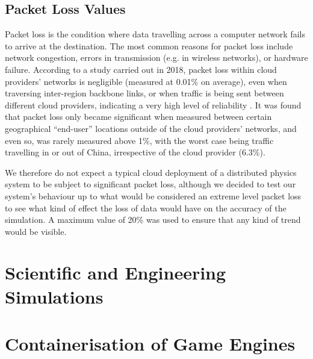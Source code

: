 \subsection{Packet Loss Values}

Packet loss is the condition where data travelling across a computer network fails to arrive at the destination. The most common reasons for packet loss include network congestion, errors in transmission (e.g. in wireless networks), or hardware failure. According to a study carried out in 2018, packet loss within cloud providers' networks is negligible (measured at 0.01\% on average), even when traversing inter-region backbone links, or when traffic is being sent between different cloud providers, indicating a very high level of reliability \cite{ThousandEyesCloudPerf2018}. It was found that packet loss only became significant when measured between certain geographical ``end-user'' locations outside of the cloud providers' networks, and even so, was rarely measured above 1\%, with the worst case being traffic travelling in or out of China, irrespective of the cloud provider (6.3\%).

We therefore do not expect a typical cloud deployment of a distributed physics system to be subject to significant packet loss, although we decided to test our system's behaviour up to what would be considered an extreme level packet loss to see what kind of effect the loss of data would have on the accuracy of the simulation. A maximum value of 20\% was used to ensure that any kind of trend would be visible.


\section{Scientific and Engineering Simulations}

\section{Containerisation of Game Engines}

